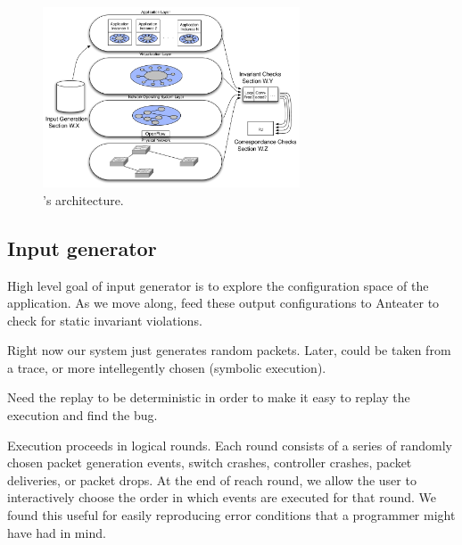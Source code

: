
\begin{figure}[t]
    \centering
    \includegraphics[width=3in]{../diagrams/architecture/Architecture_simplified.pdf}
    \caption[]{\label{fig:basicarch} \projectname{}'s architecture. \vspace{-10pt}} 
\end{figure}

\subsection{Input generator}

High level goal of input generator is to explore the configuration space of
the application. As we move along, feed these output configurations to
Anteater to check for static invariant violations.


Right now our system just generates random packets. Later, could be taken from a trace, or
more intellegently chosen (\ie symbolic execution).

Need the replay to be deterministic in order to make it easy to replay the execution
and find the bug.

Execution proceeds in logical rounds. Each round consists of a series of
randomly chosen packet generation events, switch crashes, controller crashes,
packet deliveries, or packet drops. At the end of reach round, we allow the user to
interactively choose the order in which events are executed for that round. We
found this useful for easily reproducing error conditions that a programmer
might have had in mind. 

